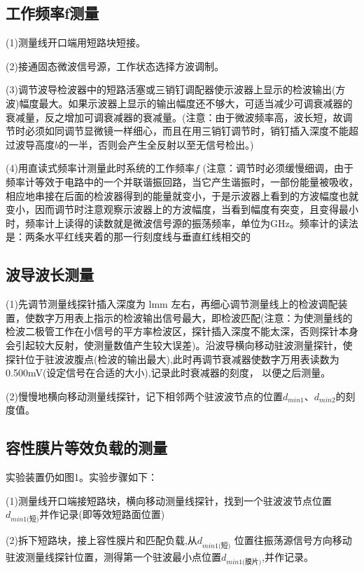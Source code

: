 \documentclass[12pt,hyperref,a4paper,UTF8]{ctexart}
\begin{document}
\subsection{工作频率f测量}
(1)测量线开口端用短路块短接。

(2)接通固态微波信号源，工作状态选择方波调制。

(3)调节波导检波器中的短路活塞或三销钉调配器使示波器上显示的检波输出(方波)幅度最大。如果示波器上显示的输出幅度还不够大，可适当减少可调衰减器的衰减量，反之增加可调衰减器的衰减量。(注意：由于微波频率高，波长短，故调节时必须如同调节显微镜一样细心，而且在用三销钉调节时，销钉插入深度不能超过波导高度$b$的一半，否则会产生全反射以至无信号检出。)

(4)用直读式频率计测量此时系统的工作频率$f$ (注意：调节时必须缓慢细调，由于频率计等效于电路中的一个并联谐振回路，当它产生谐振时，一部份能量被吸收，相应地串接在后面的检波器得到的能量就变小，于是示波器上看到的方波幅度也就变小，因而调节时注意观察示波器上的方波幅度，当看到幅度有突变，且变得最小时，频率计上读得的读数就是微波信号源的振荡频率，单位为GHz。频率计的读法是：两条水平红线夹着的那一行刻度线与垂直红线相交的



\subsection{波导波长测量}

(1)先调节测量线探针插入深度为 lmm 左右，再细心调节测量线上的检波调配装置，使数字万用表上指示的检波输出信号最大，即检波匹配(注意：为使测量线的检波二极管工作在小信号的平方率检波区，探针插入深度不能太深，否则探针本身会引起较大反射，使测量数值产生较大误差)。沿波导横向移动驻波测量探针，使探针位于驻波波腹点(检波的输出最大),此时再调节衰减器使数字万用表读数为0.500mV(设定信号在合适的大小),记录此时衰减器的刻度， 以便之后测量。

(2)慢慢地横向移动测量线探针，记下相邻两个驻波波节点的位置$d_{min1}$、$d_{min2}$的刻度值。

\subsection{容性膜片等效负载的测量}

实验装置仍如图1。实验步骤如下：

(1)测量线开口端接短路块，横向移动测量线探针，找到一个驻波波节点位置$d_{min1\text{(短)}}$并作记录(即等效短路面位置)

(2)拆下短路块，接上容性膜片和匹配负载,从$d_{min1\text{(短)}}$ 位置往振荡源信号方向移动驻波测量线探针位置，测得第一个驻波最小点位置$d_{min1\text{(膜片)}}$,并作记录。
\end{document}
